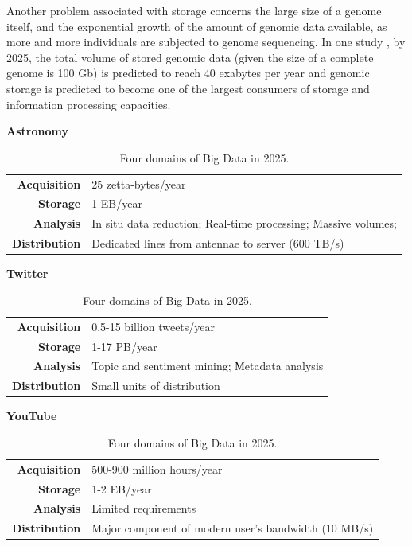 Another problem associated with storage concerns the large size of a genome itself, and the exponential growth of the amount of genomic data available, as more and more individuals are subjected to genome sequencing. In one study \cite{10.1371/journal.pbio.1002195}, by 2025, the total volume of stored genomic data (given the size of a complete genome is 100 Gb) is predicted to reach 40 exabytes per year and genomic storage is predicted to become one of the largest consumers of storage and information processing capacities.

\begin{table}[H]
  \caption{Four domains of Big Data in 2025.}


\textbf{Astronomy} \newline
\begin{tabular}{r|p{13cm}} \hline
    \small\textbf{Acquisition}  & \small 25 zetta-bytes/year \\
    \small\textbf{Storage}      & \small 1 EB/year \\
    \small\textbf{Analysis}     & \small
      In situ data reduction; Real-time processing; Massive volumes;\\
    \small\textbf{Distribution} & \small
      Dedicated lines from antennae to server (600 TB/s) \\
\end{tabular}

\vskip0.2cm


\textbf{Twitter} \newline
\begin{tabular}{r|p{13cm}} \hline
    \small\textbf{Acquisition}  & \small 0.5-15 billion tweets/year  \\
    \small\textbf{Storage}      & \small 1-17 PB/year  \\
    \small\textbf{Analysis}     & \small
      Topic and sentiment mining; Мetadata analysis \\
    \small\textbf{Distribution} & \small Small units of distribution \\
\end{tabular}
\vskip0.2cm



\textbf{YouTube} \newline
\begin{tabular}{r|p{13cm}} \hline
    \small\textbf{Acquisition}  & \small 500-900 million hours/year   \\
    \small\textbf{Storage}      & \small 1-2 EB/year   \\
    \small\textbf{Analysis}     & \small Limited requirements \\
    \small\textbf{Distribution} & \small Major component of modern user’s bandwidth (10 MB/s) \\
\end{tabular}
\vskip0.2cm




\end{table}
